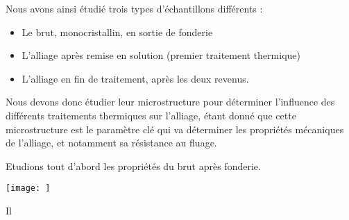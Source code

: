 Nous avons ainsi étudié trois types d'échantillons différents : 
\begin{itemize}
    \item Le brut, monocristallin, en sortie de fonderie
    \item L'alliage après remise en solution (premier traitement thermique)
    \item L'alliage en fin de traitement, après les deux revenus.
\end{itemize}


   \newline
Nous devons donc étudier leur microstructure pour déterminer l'influence des 
différents traitements thermiques sur l'alliage, étant donné que cette microstructure
est le paramètre clé qui va déterminer les propriétés mécaniques de l'alliage,
et notamment sa résistance au fluage.

Etudions tout d'abord les propriétés du brut après fonderie.

\centerline{\texttt{[image: ]}}

Il 

